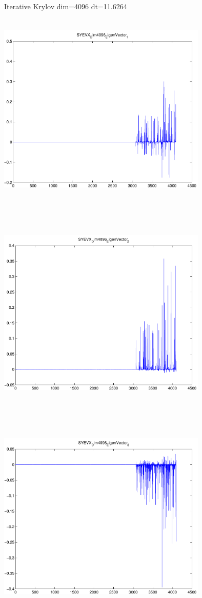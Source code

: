 \documentclass[9pt]{article}
\theoremstyle{plain}
\theoremstyle{definition}
\theoremstyle{remark}
\numberwithin{equation}{section}
\begin{document}
Iterative Krylov dim=4096 dt=11.6264
\includegraphics[width=10.0cm,height=10.0cm]{SYEVX_Dim4096_EigenVector_1.pdf}

\includegraphics[width=10.0cm,height=10.0cm]{SYEVX_Dim4096_EigenVector_2.pdf}

\includegraphics[width=10.0cm,height=10.0cm]{SYEVX_Dim4096_EigenVector_3.pdf}
\end{document}
